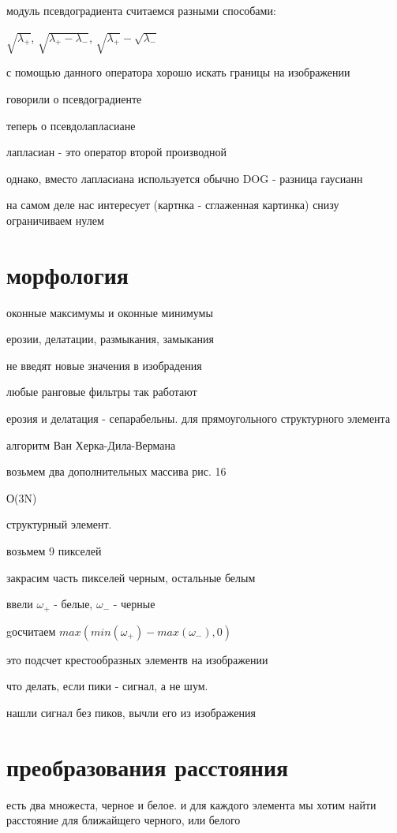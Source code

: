 \documentclass[]{report}
\begin{document}
модуль псевдоградиента считаемся разными способами:

$\sqrt{\lambda_+}$,
$\sqrt{\lambda_+ - \lambda_-}$,
$\sqrt{\lambda_+} - \sqrt{\lambda_-}$

с помощью данного оператора хорошо искать границы на изображении

говорили о псевдоградиенте

теперь о псевдолапласиане

лапласиан - это оператор второй производной

однако, вместо лапласиана используется обычно DOG - разница гаусианн

на самом деле нас интересует (картнка - сглаженная картинка) снизу ограничиваем нулем

\section{морфология}

оконные максимумы и оконные минимумы

ерозии, делатации, размыкания, замыкания

не введят новые значения в изобрадения

любые ранговые фильтры так работают

ерозия и делатация - сепарабельны. для прямоугольного структурного элемента

алгоритм Ван Херка-Дила-Вермана

возьмем два дополнительных массива 
рис. 16

О(3N)

структурный элемент. 

возьмем 9 пикселей

закрасим часть пикселей черным, остальные белым

ввели $\omega_+$ - белые, $\omega_-$ - черные

gосчитаем $max(min(\omega_+) - max(\omega_-), 0)$

это подсчет крестообразных элементв на изображении


что делать, если пики - сигнал, а не шум.

нашли сигнал без пиков, вычли его из изображения

\section{преобразования расстояния}

есть два множеста, черное и белое. и для каждого элемента мы хотим найти расстояние для ближайщего черного, или белого
\end{document}
